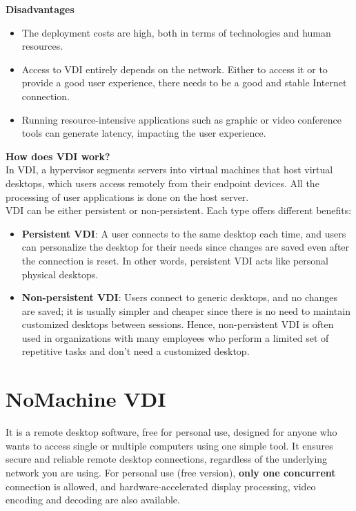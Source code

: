 \documentclass[a4paper,12pt, final]{report}
\begin{document}
\noindent \textbf{Disadvantages}
\begin{itemize}
    \item The deployment costs are high, both in terms of technologies and human resources.
    \item Access to VDI entirely depends on the network. Either to access it or to provide a good user experience, there needs to be a good and stable Internet connection.
    \item Running resource-intensive applications such as graphic or video conference tools can generate latency, impacting the user experience.
\end{itemize}

\newpage
\noindent \textbf{How does VDI work?}\\

\noindent In VDI, a hypervisor segments servers into virtual machines that host virtual desktops, which users access remotely from their endpoint devices. All the processing of user applications is done on the host server.\\

\noindent VDI can be either persistent or non-persistent. Each type offers different benefits:

\begin{itemize}
    \item \textbf{Persistent VDI}: A user connects to the same desktop each time, and users can personalize the desktop for their needs since changes are saved even after the connection is reset. In other words, persistent VDI acts like personal physical desktops.
    \item \textbf{Non-persistent VDI}: Users connect to generic desktops, and no changes are saved; it is usually simpler and cheaper since there is no need to maintain customized desktops between sessions. Hence, non-persistent VDI is often used in organizations with many employees who perform a limited set of repetitive tasks and don't need a customized desktop.
\end{itemize}

\section{NoMachine VDI}
It is a remote desktop software, free for personal use, designed for anyone who wants to access single or multiple computers using one simple tool. It ensures secure and reliable remote desktop connections, regardless of the underlying network you are using. For personal use (free version), \textbf{only one concurrent} connection is allowed, and hardware-accelerated display processing, video encoding and decoding are also available. \cite{nomachine_intro}\\
\end{document}
